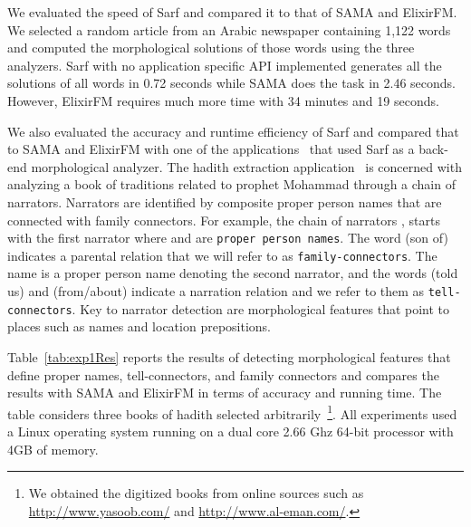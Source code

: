 We evaluated the speed of Sarf and compared it to that of SAMA and ElixirFM. 
We selected a random article from an Arabic newspaper containing 1,122 words and 
computed the morphological solutions of those words using the three analyzers. 
Sarf with no application specific API implemented generates all the solutions of 
all words in 0.72 seconds while SAMA does 
the task in 2.46 seconds. 
However, ElixirFM requires much more time with 34 minutes and 19 seconds.

We also evaluated the accuracy and runtime efficiency of 
Sarf and compared that to SAMA and ElixirFM
with one of the applications~\citep{ZaMaFlairs2012HadithBio}
that used Sarf as a back-end morphological analyzer. 
The hadith extraction application~\citep{ZaMaFlairs2012HadithBio} is concerned
with analyzing a book of traditions
related to prophet Mohammad through a chain of narrators. 
%
Narrators are identified by composite proper person names
that are connected with family connectors. 
For example, the chain of narrators , starts with the first narrator 
 where  and  
are {\tt proper person names}.
The word  (son of) indicates a parental 
relation that we will refer to as {\tt family-connectors}.
The name  is a proper person name denoting 
the second narrator, and the words 
 (told us) and  (from/about) indicate 
a narration relation and we refer to them as 
{\tt tell-connectors}. 
Key to narrator detection are morphological features that point to 
places such as names and location prepositions. 



Table~\ref{tab:exp1Res} reports the results of detecting morphological features 
that define proper names, tell-connectors, and family connectors and compares the 
results with SAMA and ElixirFM in terms of accuracy and running time. 
%
The table considers 
three books of hadith selected arbitrarily~\citep*{IbnHanbal,AlKulayni,AlTousi}\footnote{We obtained the digitized books from online sources such as \href{http://www.yasoob.com/}{http://www.yasoob.com/} and \href{http://www.al-eman.com/}{http://www.al-eman.com/}. }. 
All experiments used a Linux operating system running on a 
dual core 2.66 Ghz 64-bit processor with 4GB of memory.




